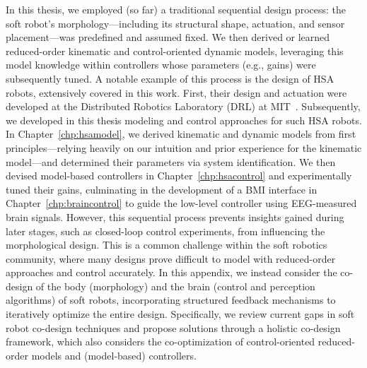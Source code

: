 \begin{foreword}
    In this thesis, we employed (so far) a traditional sequential design process: the soft robot’s morphology—including its structural shape, actuation, and sensor placement—was predefined and assumed fixed. We then derived or learned reduced-order kinematic and control-oriented dynamic models, leveraging this model knowledge within controllers whose parameters (e.g., gains) were subsequently tuned. A notable example of this process is the design of \gls{HSA} robots, extensively covered in this work. First, their design and actuation were developed at the Distributed Robotics Laboratory (DRL) at MIT~\citep{lipton2018handedness, chin2018compliant, truby2021recipe}. Subsequently, we developed in this thesis modeling and control approaches for such \gls{HSA} robots. In Chapter~\ref{chp:hsamodel}, we derived kinematic and dynamic models from first principles—relying heavily on our intuition and prior experience for the kinematic model—and determined their parameters via system identification. We then devised model-based controllers in Chapter~\ref{chp:hsacontrol} and experimentally tuned their gains, culminating in the development of a \gls{BMI} interface in Chapter~\ref{chp:braincontrol} to guide the low-level controller using EEG-measured brain signals.
    However, this sequential process prevents insights gained during later stages, such as closed-loop control experiments, from influencing the morphological design. This is a common challenge within the soft robotics community, where many designs prove difficult to model with reduced-order approaches and control accurately. In this appendix, we instead consider the co-design of the body (morphology) and the brain (control and perception algorithms) of soft robots, incorporating structured feedback mechanisms to iteratively optimize the entire design. Specifically, we review current gaps in soft robot co-design techniques and propose solutions through a holistic co-design framework, which also considers the co-optimization of control-oriented reduced-order models and (model-based) controllers.
\end{foreword}

\pagebreak

